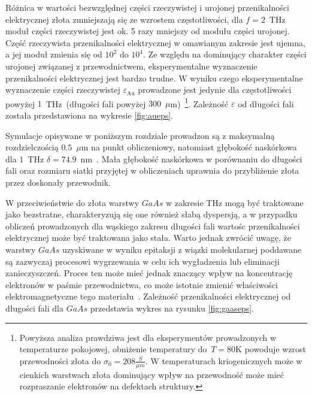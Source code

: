 Różnica w wartości bezwzględnej części rzeczywistej i urojonej przenikalności elektrycznej złota zmniejszają się ze wzrostem częstotliwości, dla $f=2$~THz moduł części rzeczywistej jest ok. 5 razy mniejszy od modułu części urojonej. Część rzeczywista przenikalności elektrycznej w omawianym zakresie jest ujemna, a jej moduł zmienia się od $10^2$ do $10^4$. Ze względu na dominujący charakter części urojonej związanej z przewodnictwem, eksperymentalne wyznaczenie przenikalności elektrycznej jest bardzo trudne. W wyniku czego eksperymentalne wyznaczenie części rzeczywistej $\varepsilon_{\textrm{Au}}$ prowadzone jest jedynie dla częstotliwości powyżej $1$~THz~(długości fali powyżej $300$~$\mu$m)~\cite{ordal1983optical}\footnote{Powyższa analiza prawdziwa jest dla eksperymentów prowadzonych w temperaturze pokojowej, obniżenie temperatury do~$T=$80K powoduje wzrost przewodności złota do $\sigma_0=208\frac{S}{\mu m}$. W temperaturach kriogenicznych może w cienkich warstwach złota dominujący wpływ na przewodność może mieć rozpraszanie elektronów na defektach struktury.\cite{lide2009crc}}. Zależność $\varepsilon$ od długości fali została przedstawiona na wykresie \ref{fig:aueps}. 

Symulacje opisywane w poniższym rozdziale prowadzon są z maksymalną rozdzielczością $0.5$~$\mu$m na punkt obliczeniowy, natomiast głębokość naskórkowa dla $1$~THz $\delta=74.9$~nm~\cite{lee2009principles}. Mała głębokość naskórkowa w porównaniu do długości fali oraz rozmiaru siatki przyjętej w obliczeniach uprawnia do przybliżenie złota przez doskonały przewodnik. 

W przeciwieństwie do złota warstwy $GaAs$ w zakresie THz mogą być traktowane jako bezstratne, charakteryzują się one również słabą dyspersją, a w przypadku obliczeń prowadzonych dla wąskiego zakresu długości fali wartośc przenikalności elektrycznej może być traktowana jako stała. Warto jednak zwrócić uwagę, że warstwy $GaAs$ uzyskiwane w wyniku epitaksji z wiązki molekularnej poddawane są zazwyczaj procesowi wygrzewania w celu ich wygładzenia lub eliminacji zanieczyszczeń. Proces ten może mieć jednak znaczący wpływ na koncentrację elektronów w paśmie przewodnictwa, co może istotnie zmienić właściwości elektromagnetyczne tego materiału~\cite{zhang2009annealing}. Zależność przenikalności elektrycznej od długości fali dla $GaAs$ przedstawia wykres na rysunku \ref{fig:gaaseps}.



